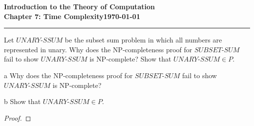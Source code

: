 \documentclass[11pt]{article}
\newcommand{\dated}{\today}
\begin{document}
\textbf{Introduction to the Theory of
Computation}\hfill\textbf{\myname}\\[0.01in]
\textbf{Chapter 7: Time Complexity}\hfill\textbf{\dated}\\
\smallskip\hrule\bigskip

\begin{problem}{7.17}
Let $UNARY\text{-}SSUM$ be the subset sum problem in which all numbers are represented in unary. Why does the NP-completeness proof for $SUBSET\text{-}SUM$ fail to show $UNARY\text{-}SSUM$ is NP-complete? Show that $UNARY\text{-}SSUM \in P$.
\end{problem}

\begin{problem}[Part]{a}
Why does the NP-completeness proof for $SUBSET\text{-}SUM$ fail to show $UNARY\text{-}SSUM$ is NP-complete?
\end{problem}


\begin{problem}[Part]{b}
Show that $UNARY\text{-}SSUM \in P$.
\end{problem}

\begin{proof}
\end{proof}
\end{document}
